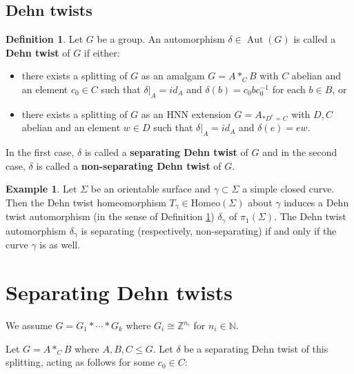 \documentclass{amsart}
\DeclareMathOperator{\Aut}{Aut}
\theoremstyle{plain}
\theoremstyle{definition}
\newtheorem{defn}[thm]{Definition}
\newtheorem{ex}[thm]{Example}
\theoremstyle{remark}
\begin{document}
\subsection{Dehn twists}
\label{section: Dehn twists}

\begin{defn}
    \label{defn: Dehn twist}
    Let $G$ be a group. An automorphism $\delta \in \Aut(G)$ is called a \textbf{Dehn twist} of $G$ if either: 
    
    \begin{itemize}
        \item there exists a splitting of $G$ as an amalgam $G = A *_C B$ with $C$ abelian and an element $c_0 \in C$ such that $\delta \vert_A = id_A$ and $\delta(b) = c_0 b c_0^{-1}$ for each $b \in B$, or 
        \item there exists a splitting of $G$ as an HNN extension $G = A_{*D^e = C}$ with $D,C$ abelian and an element $w \in D$ such that $\delta \vert_A = id_A$ and $\delta(e) = ew$. 
    \end{itemize}
    
    In the first case, $\delta$ is called a \textbf{separating Dehn twist} of $G$ and in the second case, $\delta$ is called a \textbf{non-separating Dehn twist} of $G$.
    
\end{defn}

\begin{ex}
    \label{example: Geometric Dehn twist example}
    Let $\Sigma$ be an orientable surface and $\gamma \subset \Sigma$ a simple closed curve. Then the Dehn twist homeomorphism $T_{\gamma} \in \mathrm{Homeo}(\Sigma)$ about $\gamma$ induces a Dehn twist automorphism (in the sense of Definition \ref{defn: Dehn twist}) $\delta_{\gamma}$ of $\pi_1 (\Sigma)$. The Dehn twist automorphism $\delta_{\gamma}$ is separating (respectively, non-separating) if and only if the curve $\gamma$ is as well. 
\end{ex}


\section{Separating Dehn twists}
\label{section: separating Dehn twists}


We assume $G=G_1 * \cdots * G_k$ where $G_i \cong \mathbb Z^{n_i}$ for $n_i \in \mathbb{N}$.

Let $G = A *_C B$ where $A, B, C \leq G$. Let $\delta$ be a separating Dehn twist of this splitting, acting as follows for some $c_0 \in C$:  
\end{document}
